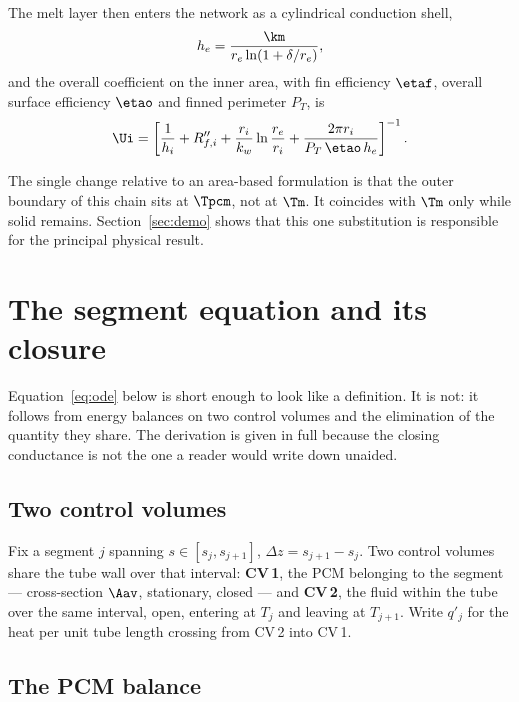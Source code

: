 The melt layer then enters the network as a cylindrical conduction shell,
\begin{equation}
  h_{e} = \frac{\km}{r_{e}\ln\!\left(1+\delta/r_{e}\right)},
  \label{eq:he}
\end{equation}
and the overall coefficient on the inner area, with fin efficiency $\etaf$,
overall surface efficiency $\etao$ and finned perimeter $P_{T}$, is
\begin{equation}
  \Ui = \left[\frac{1}{h_{i}} + R''_{f,i}
        + \frac{r_{i}}{k_{w}}\ln\frac{r_{e}}{r_{i}}
        + \frac{2\pi r_{i}}{P_{T}\,\etao\,h_{e}}\right]^{-1}.
  \label{eq:Ui}
\end{equation}

The single change relative to an area-based formulation is that the outer
boundary of this chain sits at $\Tpcm$, not at $\Tm$. It coincides with $\Tm$
only while solid remains. Section~\ref{sec:demo} shows that this one
substitution is responsible for the principal physical result.

\section{The segment equation and its closure}
\label{sec:closure}

Equation~\eqref{eq:ode} below is short enough to look like a definition. It is
not: it follows from energy balances on two control volumes and the elimination
of the quantity they share. The derivation is given in full because the closing
conductance is not the one a reader would write down unaided.

\subsection{Two control volumes}

Fix a segment $j$ spanning $s\in[s_{j},s_{j+1}]$, $\Delta z=s_{j+1}-s_{j}$. Two
control volumes share the tube wall over that interval: \textbf{CV\,1}, the PCM
belonging to the segment --- cross-section $\Aav$, stationary, closed --- and
\textbf{CV\,2}, the fluid within the tube over the same interval, open, entering
at $T_{j}$ and leaving at $T_{j+1}$. Write $q'_{j}$ for the heat per unit tube
length crossing from CV\,2 into CV\,1.

\subsection{The PCM balance}

